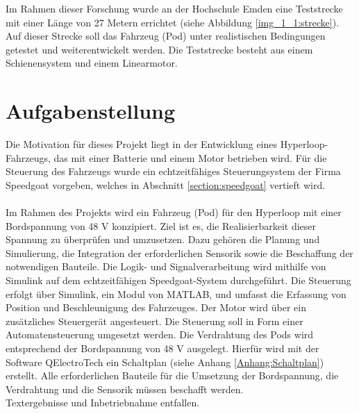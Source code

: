 
Im Rahmen dieser Forschung wurde an der Hochschule Emden eine Teststrecke mit einer Länge von 27 Metern errichtet (siehe Abbildung \ref{img_1_1:strecke}). Auf dieser Strecke soll das Fahrzeug (Pod) unter realistischen Bedingungen getestet und weiterentwickelt werden.
Die Teststrecke besteht aus einem Schienensystem und einem Linearmotor.

\newpage




\section{Aufgabenstellung}
\label{section:Aufgabenstellung}

Die Motivation für dieses Projekt liegt in der Entwicklung eines Hyperloop-Fahrzeugs, das mit einer Batterie und einem Motor betrieben wird. Für die Steuerung des Fahrzeugs wurde ein echtzeitfähiges Steuerungsystem der Firma Speedgoat vorgeben, welches in Abschnitt \ref{section:speedgoat} vertieft wird.\\ \ \\

Im Rahmen des Projekts wird ein Fahrzeug (Pod) für den Hyperloop mit einer Bordspannung von 48 V konzipiert. Ziel ist es, die Realisierbarkeit dieser Spannung zu überprüfen und umzusetzen. Dazu gehören die Planung und Simulierung, die Integration der erforderlichen Sensorik sowie die Beschaffung der notwendigen Bauteile. Die Logik- und Signalverarbeitung wird mithilfe von Simulink auf dem echtzeitfähigen Speedgoat-System durchgeführt.
Die Steuerung erfolgt über Simulink, ein Modul von MATLAB, und umfasst die Erfassung von Position und Beschleunigung des Fahrzeuges. Der Motor wird über ein zusätzliches Steuergerät angesteuert. Die Steuerung soll in Form einer Automatensteuerung umgesetzt werden.
Die Verdrahtung des Pods wird entsprechend der Bordspannung von 48 V ausgelegt. Hierfür wird mit der Software QElectroTech ein Schaltplan (siehe Anhang \ref{Anhang:Schaltplan}) erstellt.
Alle erforderlichen Bauteile für die Umsetzung der Bordspannung, die Verdrahtung und die Sensorik müssen beschafft werden.\\
Textergebnisse und Inbetriebnahme entfallen.



